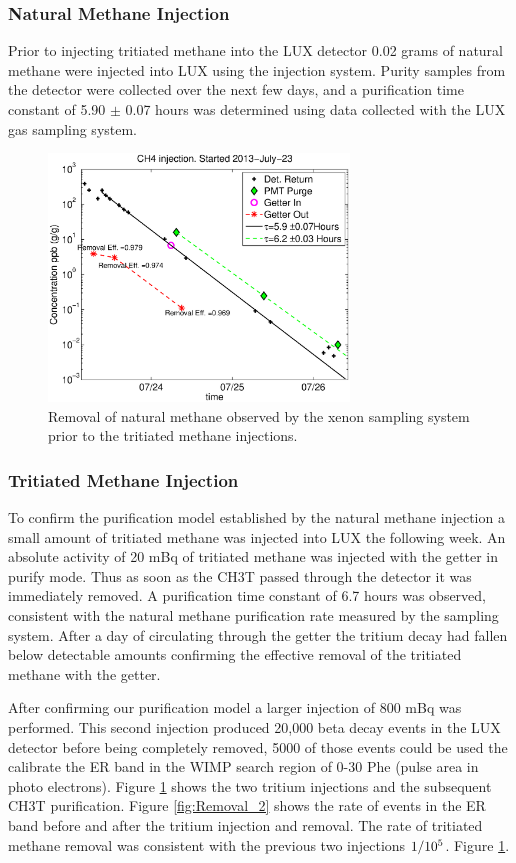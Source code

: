 \subsubsection{Natural Methane Injection}

Prior to injecting tritiated methane into the LUX detector 0.02 grams of natural methane were injected into LUX using the injection system.  Purity samples from the detector were collected over the next few days, and a purification time constant of 5.90 $\pm$ 0.07 hours was determined using data collected with the LUX gas sampling system.

\begin{figure}[H]\centering
\includegraphics[width=80mm]{CH4_injection.eps}
\caption{Removal of natural methane observed by the xenon sampling system prior to the tritiated methane injections. }
\label{fig:Removal}
\end{figure}


\subsubsection{Tritiated Methane Injection}

To confirm the purification model established by the natural methane injection a small amount of tritiated methane was injected into LUX the following week. An absolute activity of 20 mBq of tritiated methane was injected with the getter in purify mode.  Thus as soon as the CH3T passed through the detector it was immediately removed.  A purification time constant of 6.7 hours was observed, consistent with the natural methane purification rate measured by the sampling system. After a day of circulating through the getter the tritium decay had fallen below detectable amounts confirming the effective removal of the tritiated methane with the getter. 

After confirming our purification model a larger injection of 800 mBq was performed. This second injection produced 20,000 beta decay events in the LUX detector before being completely removed, 5000 of those events could be used the calibrate the ER band in the WIMP search region of 0-30 Phe (pulse area in photo electrons). 
Figure \ref{fig:Removal} shows the two tritium injections and the subsequent CH3T purification. Figure \ref{fig:Removal_2} shows the rate of events in the ER band before and after the tritium injection and removal. The rate of tritiated methane removal was consistent with the previous two injections $\rm 1/10^5$. Figure \ref{fig:Removal}.


